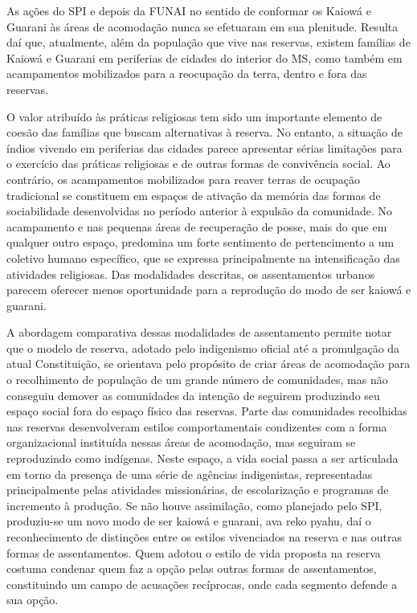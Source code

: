\documentclass{article}
\begin{document}
As a\c{c}\~oes do SPI e depois da FUNAI no sentido de conformar os
Kaiow\'a e Guarani \`as \'areas de acomoda\c{c}\~ao nunca se efetuaram
em sua plenitude. Resulta da\'i que, atualmente, al\'em da
popula\c{c}\~ao que vive nas reservas, existem fam\'ilias de Kaiow\'a e
Guarani em periferias de cidades do interior do MS, como tamb\'em em
acampamentos mobilizados para a reocupa\c{c}\~ao da terra, dentro e
fora das reservas.

O valor atribu\'ido \`as pr\'aticas religiosas tem sido um importante
elemento de coes\~ao das fam\'ilias que buscam alternativas \`a
reserva. No entanto, a situa\c{c}\~ao de \'indios vivendo em periferias
das cidades parece apresentar s\'erias limita\c{c}\~oes para o
exerc\'icio das pr\'aticas religiosas e de outras formas de
conviv\^encia social. Ao contr\'ario, os acampamentos mobilizados para
reaver terras de ocupa\c{c}\~ao tradicional se constituem em
espa\c{c}os de ativa\c{c}\~ao da mem\'oria das formas de sociabilidade
desenvolvidas no per\'iodo anterior \`a expuls\~ao da comunidade. No
acampamento e nas pequenas \'areas de recupera\c{c}\~ao de posse, mais
do que em qualquer outro espa\c{c}o, predomina um forte sentimento de
pertencimento a um coletivo humano espec\'ifico, que se expressa
principalmente na intensifica\c{c}\~ao das atividades religiosas. Das
modalidades descritas, os assentamentos urbanos parecem oferecer menos
oportunidade para a reprodu\c{c}\~ao do modo de ser kaiow\'a e guarani.


A abordagem comparativa dessas modalidades de assentamento permite notar
que o modelo de reserva, adotado pelo indigenismo oficial at\'e a
promulga\c{c}\~ao da atual Constitui\c{c}\~ao, se orientava pelo
prop\'osito de criar \'areas de acomoda\c{c}\~ao para o recolhimento de
popula\c{c}\~ao de um grande n\'umero de comunidades, mas n\~ao
conseguiu demover as comunidades da inten\c{c}\~ao de seguirem
produzindo seu espa\c{c}o social fora do espa\c{c}o f\'isico das
reservas. Parte das comunidades recolhidas nas reservas desenvolveram
estilos comportamentais condizentes com a forma organizacional
institu\'ida nessas \'areas de acomoda\c{c}\~ao, mas seguiram se
reproduzindo como ind\'igenas. Neste espa\c{c}o, a vida social passa a
ser articulada em torno da presen\c{c}a de uma s\'erie de ag\^encias
indigenistas, representadas principalmente pelas atividades
mission\'arias, de escolariza\c{c}\~ao e programas de incremento \`a
produ\c{c}\~ao. Se n\~ao houve assimila\c{c}\~ao, como planejado pelo
SPI, produziu-se um novo modo de ser kaiow\'a e guarani, ava reko
pyahu, da\'i o reconhecimento de distin\c{c}\~oes entre os estilos
vivenciados na reserva e nas outras formas de assentamentos. Quem
adotou o estilo de vida proposta na reserva costuma condenar quem faz a
op\c{c}\~ao pelas outras formas de assentamentos, constituindo um campo
de acusa\c{c}\~oes rec\'iprocas, onde cada segmento defende a sua
op\c{c}\~ao.
\end{document}

